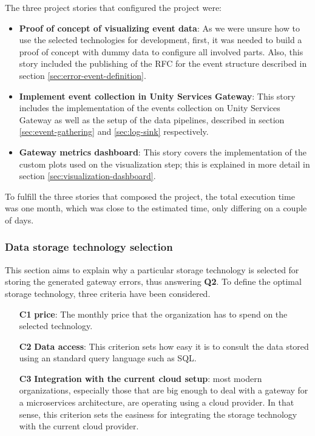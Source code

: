 \documentclass[english, 12pt, a4paper, sci, utf8, a-1b, online]{aaltothesis}
\begin{document}
The three project stories that configured the project were:

\begin{itemize}
    \item \textbf{Proof of concept of visualizing event data}: As we were unsure how to use the selected technologies for development, first, it was needed to build a proof of concept with dummy data to configure all involved parts. Also, this story included the publishing of the RFC for the event structure described in section \ref{sec:error-event-definition}.
    \item \textbf{Implement event collection in Unity Services Gateway}: This story includes the implementation of the events collection on Unity Services Gateway as well as the setup of the data pipelines, described in section \ref{sec:event-gathering} and \ref{sec:log-sink} respectively.
    \item \textbf{Gateway metrics dashboard}: This story covers the implementation of the custom plots used on the visualization step; this is explained in more detail in section \ref{sec:visualization-dashboard}.
\end{itemize}

To fulfill the three stories that composed the project, the total execution time was one month, which was close to the estimated time, only differing on a couple of days.

\subsubsection{Data storage technology selection}

This section aims to explain why a particular storage technology is selected for storing the generated gateway errors, thus answering \textbf{Q2}. To define the optimal storage technology, three criteria have been considered.

\begin{itemize}
    \item[\textbf{C1}] \textbf{price}: The monthly price that the organization has to spend on the selected technology.
    \item[\textbf{C2}] \textbf{Data access}: This criterion sets how easy it is to consult the data stored using an standard query language such as SQL.
    \item[\textbf{C3}] \textbf{Integration with the current cloud setup}: most modern organizations, especially those that are big enough to deal with a gateway for a microservices architecture, are operating using a cloud provider. In that sense, this criterion sets the easiness for integrating the storage technology with the current cloud provider.
\end{itemize}
\end{document}
